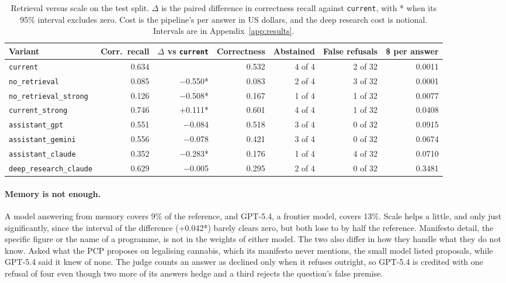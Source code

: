 \begin{table}[htbp]
    \centering
    \footnotesize
    \begin{adjustbox}{max width=\textwidth}
    \begin{tabular}{|l|r|r|r|r|r|r|}
        \hline
        \textbf{Variant} & \textbf{Corr.\ recall} & \textbf{$\Delta$ vs \texttt{current}} & \textbf{Correctness} & \textbf{Abstained} & \textbf{False refusals} & \textbf{\$ per answer} \\
        \hline
        \texttt{current} & 0.634 & & 0.532 & 4 of 4 & 2 of 32 & 0.0011 \\
        \hline
        \texttt{no\_retrieval} & 0.085 & $-$0.550* & 0.083 & 2 of 4 & 3 of 32 & 0.0001 \\
        \texttt{no\_retrieval\_strong} & 0.126 & $-$0.508* & 0.167 & 1 of 4 & 1 of 32 & 0.0077 \\
        \texttt{current\_strong} & 0.746 & $+$0.111* & 0.601 & 4 of 4 & 1 of 32 & 0.0408 \\
        \hline
        \texttt{assistant\_gpt} & 0.551 & $-$0.084 & 0.518 & 3 of 4 & 0 of 32 & 0.0915 \\
        \texttt{assistant\_gemini} & 0.556 & $-$0.078 & 0.421 & 3 of 4 & 0 of 32 & 0.0674 \\
        \texttt{assistant\_claude} & 0.352 & $-$0.283* & 0.176 & 1 of 4 & 4 of 32 & 0.0710 \\
        \texttt{deep\_research\_claude} & 0.629 & $-$0.005 & 0.295 & 2 of 4 & 0 of 32 & 0.3481 \\
        \hline
    \end{tabular}
    \end{adjustbox}
    \caption[Retrieval versus scale]{Retrieval versus scale on the test split.
    $\Delta$ is the paired difference in correctness recall against
    \texttt{current}, with * when its 95\% interval excludes zero. Cost is the
    pipeline's per answer in US dollars, and the deep research cost is notional.
    Intervals are in Appendix~\ref{app:results}.}
    \label{tab:results-scale}
\end{table}

\paragraph{Memory is not enough.} A model answering from memory covers 9\% of
the reference, and GPT-5.4, a frontier model, covers 13\%. Scale helps a
little, and only just significantly, since the interval of the difference
(+0.042*) barely clears zero, but
both lose to \sysname{} by half the reference. Manifesto detail, the specific
figure or the name of a programme, is not in the weights of either model. The
two also differ in how they handle what they do not know. Asked what the PCP
proposes on legalising cannabis, which its manifesto never mentions, the small
model listed proposals, while GPT-5.4 said it knew of none. The judge counts an
answer as declined only when it refuses outright, so GPT-5.4 is credited with
one refusal of four even though two more of its answers hedge and a third
rejects the question's false premise.

